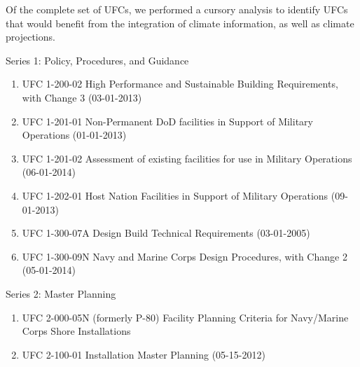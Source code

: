 \documentclass[10pt]{amsart}
\begin{document}
Of the complete set of UFCs, we performed a cursory analysis to identify UFCs that would benefit from the integration of climate information, as well as climate projections.

Series 1: Policy, Procedures, and Guidance
\begin{enumerate}
\item UFC 1-200-02 High Performance and Sustainable Building Requirements, with Change 3 (03-01-2013)
\item UFC 1-201-01 Non-Permanent DoD facilities in Support of Military Operations (01-01-2013)
\item UFC 1-201-02 Assessment of existing facilities for use in Military Operations (06-01-2014)
\item UFC 1-202-01 Host Nation Facilities in Support of Military Operations (09-01-2013)
\item UFC 1-300-07A Design Build Technical Requirements (03-01-2005)
\item UFC 1-300-09N Navy and Marine Corps Design Procedures, with Change 2 (05-01-2014)
\end{enumerate}

Series 2: Master Planning
\begin{enumerate}
\item UFC 2-000-05N (formerly P-80) Facility Planning Criteria for Navy/Marine Corps Shore Installations
\item UFC 2-100-01 Installation Master Planning (05-15-2012)
\end{enumerate}
\end{document}
